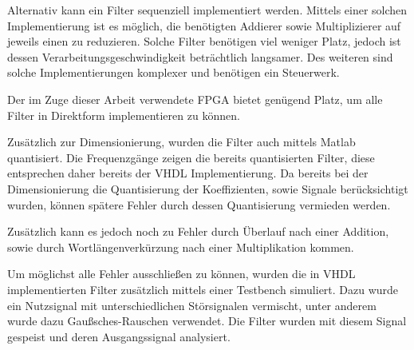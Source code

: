 Alternativ kann ein Filter sequenziell implementiert werden. Mittels einer solchen Implementierung ist es möglich, die benötigten Addierer sowie Multiplizierer auf jeweils einen zu reduzieren. Solche Filter benötigen viel weniger Platz, jedoch ist dessen Verarbeitungsgeschwindigkeit beträchtlich langsamer.
Des weiteren sind solche Implementierungen komplexer und benötigen ein Steuerwerk.

Der im Zuge dieser Arbeit verwendete FPGA bietet genügend Platz, um alle Filter in Direktform implementieren zu können.

Zusätzlich zur Dimensionierung, wurden die Filter auch mittels Matlab quantisiert. Die Frequenzgänge zeigen die bereits quantisierten Filter, diese entsprechen daher bereits der VHDL Implementierung. Da bereits bei der Dimensionierung die Quantisierung der Koeffizienten, sowie Signale berücksichtigt wurden, können spätere Fehler durch dessen Quantisierung vermieden werden.

Zusätzlich kann es jedoch noch zu Fehler durch Überlauf nach einer Addition, sowie durch Wortlängenverkürzung nach einer Multiplikation kommen. 

Um möglichst alle Fehler ausschließen zu können, wurden die in VHDL implementierten Filter zusätzlich mittels einer Testbench simuliert. Dazu wurde ein Nutzsignal mit unterschiedlichen Störsignalen vermischt, unter anderem wurde dazu Gaußsches-Rauschen verwendet.
Die Filter wurden mit diesem Signal gespeist und deren Ausgangssignal analysiert.